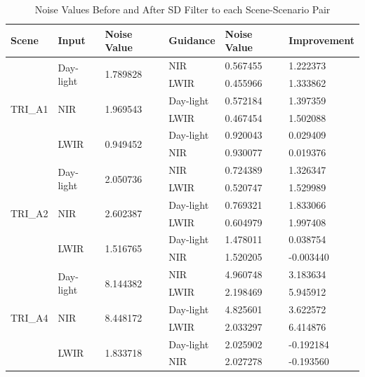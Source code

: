 \documentclass[10pt,twocolumn,letterpaper]{article}
\begin{document}
\bgroup
\def\arraystretch{1.25}\setlength{\tabcolsep}{1.7em}
\begin{table}[]
	\centering
	\caption{Noise Values Before and After SD Filter to each Scene-Scenario Pair}
	\label{tab:noise-outputs}
	\begin{tabular}{llllll}
		\hline
		Scene                    & Input                      & Noise Value               & Guidance  & Noise Value & Improvement \\ \hline
		\multirow{6}{*}{TRI\_A1} & \multirow{2}{*}{Day-light} & \multirow{2}{*}{1.789828} & NIR       & 0.567455 & 1.222373    \\
		&                            &                           & LWIR      & 0.455966 & 1.333862    \\ \cline{2-6} 
		& \multirow{2}{*}{NIR}       & \multirow{2}{*}{1.969543} & Day-light & 0.572184 & 1.397359    \\
		&                            &                           & LWIR      & 0.467454 & 1.502088    \\ \cline{2-6} 
		& \multirow{2}{*}{LWIR}      & \multirow{2}{*}{0.949452} & Day-light & 0.920043 & 0.029409    \\
		&                            &                           & NIR       & 0.930077 & 0.019376    \\ \hline
		\multirow{6}{*}{TRI\_A2} & \multirow{2}{*}{Day-light} & \multirow{2}{*}{2.050736} & NIR       & 0.724389 & 1.326347    \\
		&                            &                           & LWIR      & 0.520747 & 1.529989    \\ \cline{2-6} 
		& \multirow{2}{*}{NIR}       & \multirow{2}{*}{2.602387} & Day-light & 0.769321 & 1.833066    \\
		&                            &                           & LWIR      & 0.604979 & 1.997408    \\ \cline{2-6} 
		& \multirow{2}{*}{LWIR}      & \multirow{2}{*}{1.516765} & Day-light & 1.478011 & 0.038754    \\
		&                            &                           & NIR       & 1.520205 & -0.003440   \\ \hline
		\multirow{6}{*}{TRI\_A4} & \multirow{2}{*}{Day-light} & \multirow{2}{*}{8.144382} & NIR       & 4.960748 & 3.183634    \\
		&                            &                           & LWIR      & 2.198469 & 5.945912    \\ \cline{2-6} 
		& \multirow{2}{*}{NIR}       & \multirow{2}{*}{8.448172} & Day-light & 4.825601 & 3.622572    \\
		&                            &                           & LWIR      & 2.033297 & 6.414876    \\ \cline{2-6} 
		& \multirow{2}{*}{LWIR}      & \multirow{2}{*}{1.833718} & Day-light & 2.025902 & -0.192184   \\
		&                            &                           & NIR       & 2.027278 & -0.193560   \\ \hline
	\end{tabular}
	
\end{table}
\egroup
\end{document}
